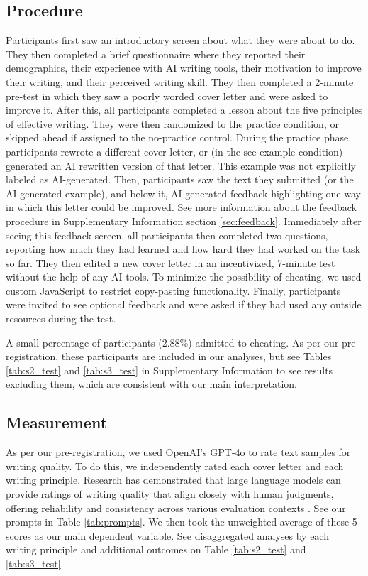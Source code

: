 \documentclass[11pt]{report}
\begin{document}
\begin{mainf}
\subsection{Procedure}
Participants first saw an introductory screen about what they were about to do. 
  They then completed a brief questionnaire where they reported their demographics, their experience with AI writing tools, their motivation to improve their writing, and their perceived writing skill. 
  They then completed a 2-minute pre-test in which they saw a poorly worded cover letter and were asked to improve it. 
  After this, all participants completed a lesson about the five principles of effective writing. 
  They were then randomized to the practice condition, or skipped ahead if assigned to the no-practice control. 
  During the practice phase, participants rewrote a different cover letter, or (in the see example condition) generated an AI rewritten version of that letter. 
  This example was not explicitly labeled as AI-generated.
  Then, participants saw the text they submitted (or the AI-generated example), and below it, AI-generated feedback highlighting one way in which this letter could be improved. See more information about the feedback procedure in Supplementary Information section \ref{sec:feedback}.
  Immediately after seeing this feedback screen, all participants then completed two questions, reporting how much they had learned and how hard they had worked on the task so far. 
  They then edited a new cover letter in an incentivized, 7-minute test without the help of any AI tools. 
  To minimize the possibility of cheating, we used custom JavaScript to restrict copy-pasting functionality. 
  Finally, participants were invited to see optional feedback and were asked if they had used any outside resources during the test. 
  
A small percentage of participants (2.88\%) admitted to cheating. 
  As per our pre-registration, these participants are included in our analyses, but see Tables \ref{tab:s2_test} and \ref{tab:s3_test} in Supplementary Information to see results excluding them, which are consistent with our main interpretation.

\subsection{Measurement}
As per our pre-registration, we used OpenAI's GPT-4o to rate text samples for writing quality. 
    To do this, we independently rated each cover letter and each writing principle. 
    Research has demonstrated that large language models can provide ratings of writing quality that align closely with human judgments, offering reliability and consistency across various evaluation contexts \cite{rathje2024, hackl2023}.
    See our prompts in Table \ref{tab:prompts}. 
    We then took the unweighted average of these 5 scores as our main dependent variable. 
    See disaggregated analyses by each writing principle and additional outcomes on Table \ref{tab:s2_test} and \ref{tab:s3_test}.


\end{mainf}
\end{document}
